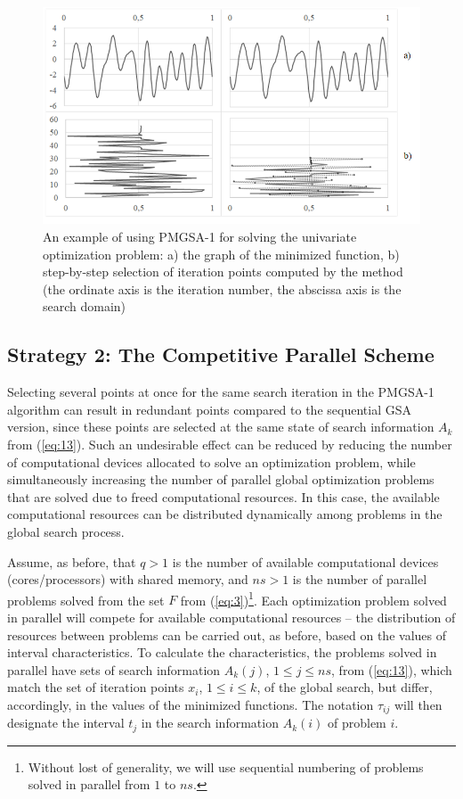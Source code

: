 \documentclass[review]{elsarticle}
\begin{document}
\begin{figure}
  \centering
  \includegraphics[width=\linewidth]{fig2}
  \caption{An example of using PMGSA-1 for solving the univariate optimization problem: a) the graph of the minimized function, b) step-by-step selection of iteration points computed by the method (the ordinate axis is the iteration number, the abscissa axis is the search domain)}
  \label{fig:2}
\end{figure}

\subsection{Strategy 2: The Competitive Parallel Scheme} \label{subsec:2}

Selecting several points at once for the same search iteration in the PMGSA-1 algorithm can result in redundant points compared to the sequential GSA version, since these points are selected at the same state of search information $A_k$ from (\ref{eq:13}). Such an undesirable effect can be reduced by reducing the number of computational devices allocated to solve an optimization problem, while simultaneously increasing the number of parallel global optimization problems that are solved due to freed computational resources. In this case, the available computational resources can be distributed dynamically among problems in the global search process.

Assume, as before, that $q>1$ is the number of available computational devices (cores/processors) with shared memory, and $ns>1$ is the number of parallel problems solved from the set $F$ from (\ref{eq:3})\footnote{Without lost of generality, we will use sequential numbering of problems solved in parallel from $1$ to $ns$.}. Each optimization problem solved in parallel will compete for available computational resources -- the distribution of resources between problems can be carried out, as before, based on the values of interval characteristics. To calculate the characteristics, the problems solved in parallel have sets of search information $A_k(j)$, $1\leq j \leq ns$, from (\ref{eq:13}), which match the set of iteration points $x_i$, $1 \leq i \leq k$, of the global search, but differ, accordingly, in the values of the minimized functions. The notation $\tau_{ij}$ will then designate the interval $t_j$ in the search information $A_k(i)$ of problem $i$.
\end{document}
